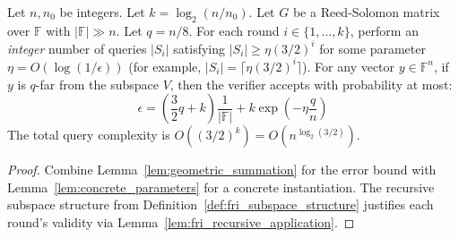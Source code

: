 \begin{theorem} \label{thm:fri_security_complete}  \leanok
{}
Let $n, n_0$ be integers. Let $k = \log_2(n/n_0)$.
Let $G$ be a Reed-Solomon matrix over $\mathbb{F}$ with $|\mathbb{F}| \gg n$.
Let $q = n/8$.
For each round $i \in \{1, \ldots, k\}$, perform an \emph{integer} number of queries
$|S_i|$ satisfying $|S_i| \ge \eta(3/2)^i$ for some parameter
$\eta = O(\log(1/\epsilon))$ (for example, $|S_i| = \lceil \eta (3/2)^i \rceil$).
For any vector $y \in \mathbb{F}^n$, if $y$ is $q$-far from the subspace $V$, then the verifier accepts with probability at most:
\[ \epsilon = \left(\frac{3}{2}q + k\right)\frac{1}{|\mathbb{F}|} + k \exp\left(-\eta \frac{q}{n}\right) \]
The total query complexity is $O((3/2)^k) = O(n^{\log_2(3/2)})$.
\end{theorem}
\begin{proof} \leanok
Combine Lemma~\ref{lem:geometric_summation} for the error bound with Lemma~\ref{lem:concrete_parameters} for a concrete instantiation. The recursive subspace structure from Definition~\ref{def:fri_subspace_structure} justifies each round's validity via Lemma~\ref{lem:fri_recursive_application}.
\end{proof}
